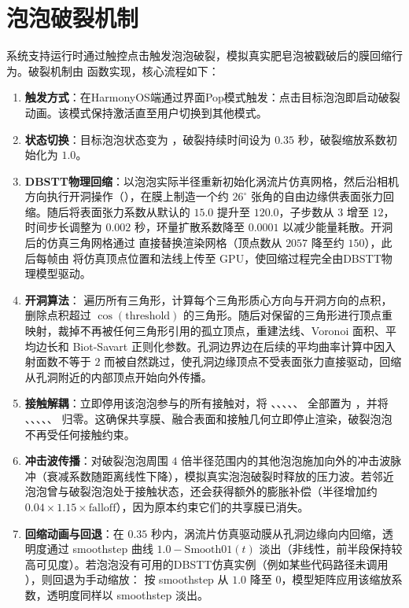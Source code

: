 \section{泡泡破裂机制}\label{sec:burst}

系统支持运行时通过触控点击触发泡泡破裂，模拟真实肥皂泡被戳破后的膜回缩行为。破裂机制由  函数实现，核心流程如下：

\begin{enumerate}
  \item \textbf{触发方式}：在HarmonyOS端通过界面Pop模式触发：点击目标泡泡即启动破裂动画。该模式保持激活直至用户切换到其他模式。
  \item \textbf{状态切换}：目标泡泡状态变为 ，破裂持续时间设为 $0.35$ 秒，破裂缩放系数初始化为 $1.0$。
  \item \textbf{DBSTT物理回缩}：以泡泡实际半径重新初始化涡流片仿真网格，然后沿相机方向执行开洞操作（），在膜上制造一个约 $26^\circ$ 张角的自由边缘供表面张力回缩。随后将表面张力系数从默认的 $15.0$ 提升至 $120.0$，子步数从 $3$ 增至 $12$，时间步长调整为 $0.002$ 秒，环量扩散系数降至 $0.0001$ 以减少能量耗散。开洞后的仿真三角网格通过  直接替换渲染网格（顶点数从 $2057$ 降至约 $150$），此后每帧由  将仿真顶点位置和法线上传至 GPU，使回缩过程完全由DBSTT物理模型驱动。
  \item \textbf{开洞算法}： 遍历所有三角形，计算每个三角形质心方向与开洞方向的点积，删除点积超过 $\cos(\text{threshold})$ 的三角形。随后对保留的三角形进行顶点重映射，裁掉不再被任何三角形引用的孤立顶点，重建法线、Voronoi 面积、平均边长和 Biot-Savart 正则化参数。孔洞边界边在后续的平均曲率计算中因入射面数不等于 $2$ 而被自然跳过，使孔洞边缘顶点不受表面张力直接驱动，回缩从孔洞附近的内部顶点开始向外传播。
  \item \textbf{接触解耦}：立即停用该泡泡参与的所有接触对，将 、、、、、 全部置为 ，并将 、、、、、 归零。这确保共享膜、融合表面和接触几何立即停止渲染，破裂泡泡不再受任何接触约束。
  \item \textbf{冲击波传播}：对破裂泡泡周围 $4$ 倍半径范围内的其他泡泡施加向外的冲击波脉冲（衰减系数随距离线性下降），模拟真实泡泡破裂时释放的压力波。若邻近泡泡曾与破裂泡泡处于接触状态，还会获得额外的膨胀补偿（半径增加约 $0.04 \times 1.15 \times \mathrm{falloff}$），因为原本约束它们的共享膜已消失。
  \item \textbf{回缩动画与回退}：在 $0.35$ 秒内，涡流片仿真驱动膜从孔洞边缘向内回缩，透明度通过 smoothstep 曲线 $1.0 - \mathrm{Smooth01}(t)$ 淡出（非线性，前半段保持较高可见度）。若泡泡没有可用的DBSTT仿真实例（例如某些代码路径未调用 ），则回退为手动缩放： 按 smoothstep 从 $1.0$ 降至 $0$，模型矩阵应用该缩放系数，透明度同样以 smoothstep 淡出。
\end{enumerate}

